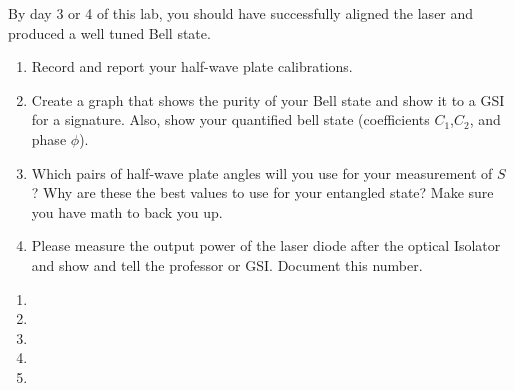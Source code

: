 \documentclass{../signatures}
\begin{document}
\prelabsignatures

\midlab
By day 3 or 4 of this lab, you should have successfully aligned the laser and produced a well tuned Bell state.
\begin{enumerate}
    \item Record and report your half-wave plate calibrations.
    \item Create a graph that shows the purity of your Bell state and show it to a GSI for a signature. Also, show your quantified bell state (coefficients $C_1$,$C_2$, and phase $\phi$). 
    \item Which pairs of half-wave plate angles will you use for your measurement of $S$? Why are these the best values to use for your entangled state? Make sure you have math to back you up. 
    \item Please measure the output power of the laser diode after the optical Isolator and show and tell the professor or GSI. Document this number.
\\[32pt]
\end{enumerate}


\checkpointsection
\begin{enumerate}

\item {}

\item {}

\item {}

\item {}

\item {}

\end{enumerate}
\end{document}
